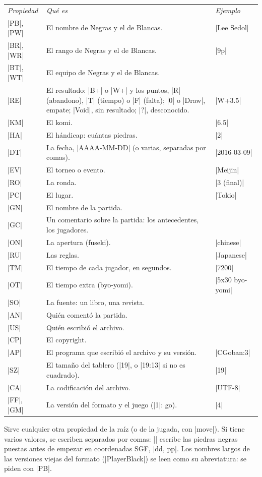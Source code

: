 \begin{command}{\sgfinfo{}}
	\begin{center}
		\small
		\begin{tabular}{lp{6.5cm}l}
			\emph{Propiedad} & \emph{Qué es} & \emph{Ejemplo} \\[2pt]
			|PB|, |PW| & El nombre de Negras y el de Blancas. & |Lee Sedol| \\
			|BR|, |WR| & El rango de Negras y el de Blancas. & |9p| \\
			|BT|, |WT| & El equipo de Negras y el de Blancas. & \\
			|RE| & El resultado: |B+| o |W+| y los puntos, |R| (abandono), |T| (tiempo) o |F| (falta); |0| o |Draw|, empate; |Void|, sin resultado; |?|, desconocido. & |W+3.5| \\
			|KM| & El komi. & |6.5| \\
			|HA| & El hándicap: cuántas piedras. & |2| \\
			|DT| & La fecha, |AAAA-MM-DD| (o varias, separadas por comas). & |2016-03-09| \\
			|EV| & El torneo o evento. & |Meijin| \\
			|RO| & La ronda. & |3 (final)| \\
			|PC| & El lugar. & |Tokio| \\
			|GN| & El nombre de la partida. & \\
			|GC| & Un comentario sobre la partida: los antecedentes, los jugadores. & \\
			|ON| & La apertura (fuseki). & |chinese| \\
			|RU| & Las reglas. & |Japanese| \\
			|TM| & El tiempo de cada jugador, en segundos. & |7200| \\
			|OT| & El tiempo extra (byo-yomi). & |5x30 byo-yomi| \\
			|SO| & La fuente: un libro, una revista. & \\
			|AN| & Quién comentó la partida. & \\
			|US| & Quién escribió el archivo. & \\
			|CP| & El copyright. & \\
			|AP| & El programa que escribió el archivo y su versión. & |CGoban:3| \\
			|SZ| & El tamaño del tablero (|19|, o |19:13| si no es cuadrado). & |19| \\
			|CA| & La codificación del archivo. & |UTF-8| \\
			|FF|, |GM| & La versión del formato y el juego (|1|: go). & |4| \\
		\end{tabular}
	\end{center}

	Sirve cualquier otra propiedad de la raíz (o de la jugada, con |move|). Si tiene varios valores, se escriben separados por comas: || escribe las piedras negras puestas antes de empezar en coordenadas SGF, |dd, pp|. Los nombres largos de las versiones viejas del formato (|PlayerBlack|) se leen como su abreviatura: se piden con |PB|.
\end{command}

